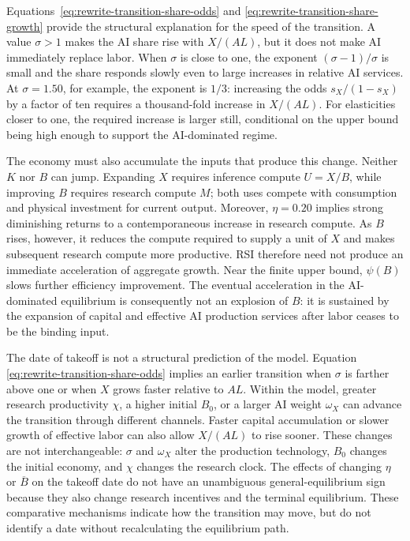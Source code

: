 Equations~\eqref{eq:rewrite-transition-share-odds} and
\eqref{eq:rewrite-transition-share-growth} provide the structural explanation
for the speed of the transition. A value $\sigma>1$ makes the AI share rise
with $X/(AL)$, but it does not make
AI immediately replace labor. When $\sigma$ is close to one, the exponent
$(\sigma-1)/\sigma$ is small and the share responds slowly even to large
increases in relative AI services. At $\sigma=1.50$, for example, the
exponent is $1/3$: increasing the odds $s_X/(1-s_X)$ by a factor of ten
requires a thousand-fold increase in $X/(AL)$. For elasticities closer to
one, the required increase is larger still, conditional on the upper bound
being high enough to support the AI-dominated regime.

The economy must also accumulate the inputs that produce this change.
Neither $K$ nor $B$ can jump. Expanding $X$ requires inference compute
$U=X/B$, while improving $B$ requires research compute $M$; both uses compete
with consumption and physical investment for current output. Moreover,
$\eta=0.20$ implies strong diminishing returns to a contemporaneous increase
in research compute. As $B$ rises, however, it reduces the compute required
to supply a unit of $X$ and makes subsequent research compute more productive.
RSI therefore need not produce an immediate acceleration of aggregate growth. Near the finite upper bound,
$\psi(B)$ slows further efficiency improvement. The eventual acceleration in
the AI-dominated equilibrium is consequently not an explosion of $B$: it is
sustained by the expansion of capital and effective AI production services
after labor ceases to be the binding input.

The date of takeoff is not a structural prediction of the model. Equation
\eqref{eq:rewrite-transition-share-odds} implies an earlier transition when
$\sigma$ is farther above one or when $X$ grows faster relative to $AL$.
Within the model, greater research productivity $\chi$, a higher initial
$B_0$, or a larger AI weight $\omega_X$ can advance the transition through
different channels. Faster capital accumulation or slower growth of effective
labor can also allow $X/(AL)$ to rise sooner. These changes are not
interchangeable: $\sigma$ and $\omega_X$ alter the production technology,
$B_0$ changes the initial economy, and $\chi$ changes the research clock. The
effects of changing $\eta$ or $\overline B$ on the takeoff date do not have an
unambiguous general-equilibrium sign because they also change research
incentives and the terminal equilibrium. These comparative mechanisms indicate
how the transition may move, but do not identify a date without recalculating
the equilibrium path.

